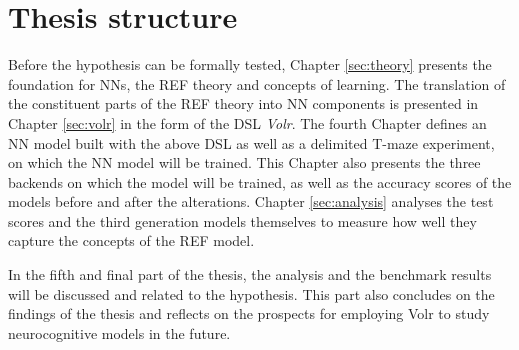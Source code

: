 \section{Thesis structure}
Before the hypothesis can be formally tested, Chapter \ref{sec:theory}
presents the foundation for \gls{NN}s, the \gls{REF} theory and
concepts of learning.
The translation of the constituent parts of the \gls{REF} theory
into \gls{NN} components is presented in Chapter \ref{sec:volr} in 
the form of the \gls{DSL} \textit{Volr}. 
The fourth Chapter defines an \gls{NN} model built with the above
\gls{DSL} as well as a delimited T-maze experiment, on which the 
\gls{NN} model will be trained.
This Chapter also presents the three \gls{backend}s on which the 
model will be trained, as well as the accuracy scores of the models
before and after the alterations.
Chapter \ref{sec:analysis} analyses the test scores and the third 
generation models themselves to measure how well they capture the
concepts of the \gls{REF} model.

In the fifth and final part of the thesis, the analysis and the benchmark
results will be discussed and related to the hypothesis.
This part also concludes on the findings of the thesis and
reflects on the prospects for employing Volr to study neurocognitive
models in the future.



